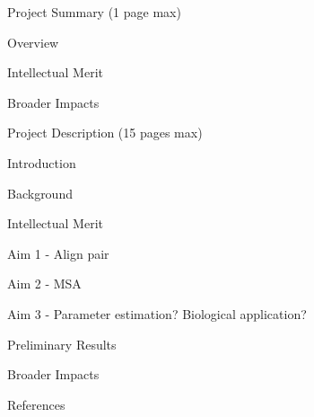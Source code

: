 
\usepackage{outline}


\begin{outline}
	\item Project Summary (1 page max)
	\begin{outline}
		\item Overview
		\item Intellectual Merit
		\item Broader Impacts
	\end{outline}
	\item Project Description (15 pages max)
	\begin{outline}
		\item Introduction
		\item Background
		\item Intellectual Merit
		\begin{outline}
			\item Aim 1 - Align pair %
			\item Aim 2 - MSA        %
			\item Aim 3 - Parameter estimation? Biological application? %
		\end{outline}
		\item Preliminary Results
		\item Broader Impacts
		\item References
	\end{outline}
\end{outline}

